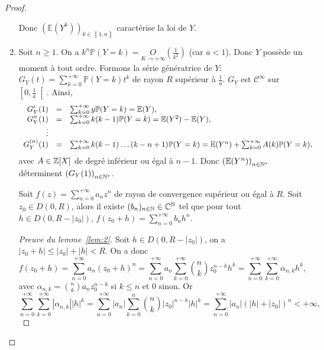 \documentclass[12pt]{article}
\begin{document}
\begin{proof}
\begin{enumerate}
        Donc $\left(\mathbb{E}(Y^{k})\right)_{k\in\left\llbracket1,n\right\rrbracket}$ caractérise la loi de $Y$.

        \item Soit $n\geqslant1$. On a $k^{n}\mathbb{P}(Y=k)=\underset{K\to+\infty}{O}\left(\frac{1}{k^{2}}\right)$ (car $a<1$). Donc $Y$ possède un moment à tout ordre. Formons la série génératrice de $Y$: $G_Y(t)=\sum_{k=0}^{+\infty}\mathbb{P}\left(Y=k\right)t^{k}$ de rayon $R$ supérieur à $\frac{1}{a}$. $G_Y$ est $\mathcal{C}^{\infty}$ sur $\left[0,\frac{1}{a}\right[$. Ainsi,
        \begin{equation}
            \begin{array}[]{rcl}
                G_Y'(1) &=&\sum_{k=0}^{+\infty}y\mathbb{P}(Y=k)=\mathbb{E}(Y),\\
                G_Y''(1) &=& \sum_{k=0}^{+\infty}k(k-1)\mathbb{P}(Y=k)=\mathbb{E}(Y^{2})-\mathbb{E}(Y),\\
                \vdots\\
                G_Y^{(n)}(1) &=& \sum_{k=0}^{+\infty}k(k-1)\dots(k-n+1)\mathbb{P}(Y=k)=\mathbb{E}(Y^{n})+\sum_{k=0}^{+\infty}A(k)\mathbb{P}(Y=k),
            \end{array}
        \end{equation}
        avec $A\in\mathbb{Z}[X]$ de degré inférieur ou égal à $n-1$. Donc $\left(\mathbb{E}(Y^{n})\right)_{n\in\mathbb{N}^{*}}$ déterminent $\left(G_Y(1)\right)_{n\in\mathbb{N}^{*}}$.

        \begin{lemma}
            \label{lem:2}
            Soit $f(z)=\sum_{n=0}^{+\infty}a_nz^{n}$ de rayon de convergence supérieur ou égal à $R$. Soit $z_0\in D(0,R)$, alors il existe $(b_n)_{n\in\mathbb{N}}\in\mathbb{C}^{\mathbb{N}}$ tel que pour tout $h\in D(0,R-\left\lvert z_0\right\rvert)$, $f(z_{0}+h)=\sum_{n=0}^{+\infty}b_n h^{n}$.
        \end{lemma}
        \begin{proof}[Preuve du lemme~\ref{lem:2}]
            Soit $h\in D(0,R-\left\lvert z_0\right\rvert)$, on a $\left\lvert z_{0}+h\right\rvert\leqslant\left\lvert z_0\right\rvert+\left\lvert h\right\rvert<R$. On a donc 
            \begin{equation}
                f(z_{0}+h)=\sum_{n=0}^{+\infty}a_n (z_{0}+h)^{n}=\sum_{n=0}^{+\infty}a_n\sum_{k=0}^{+\infty}\binom{n}{k}z_{0}^{n-k}h^{k}=\sum_{n=0}^{+\infty}\sum_{k=0}^{+\infty}\alpha_{n,k}h^{k},
            \end{equation}
            avec $\alpha_{n,k}=\binom{n}{k}a_nz_{0}^{n-k}$ si $k\leqslant n$ et 0 sinon. Or 
            \begin{equation}
                \sum_{n=0}^{+\infty}\sum_{k=0}^{+\infty}\left\lvert \alpha_{n,k}\right\rvert\left\lvert h\right\rvert^{k}=\sum_{n=0}^{+\infty}\left\lvert a_n\right\rvert\sum_{k=0}^{n}\binom{n}{k}\left\lvert z_{0}\right\rvert^{n-k}\left\lvert h\right\rvert^{k}=\sum_{n=0}^{+\infty}\left\lvert a_n\right\rvert\left(\left\lvert h\right\rvert+\left\lvert z_{0}\right\rvert\right)^{n}<+\infty,
            \end{equation}
            

\end{proof}
\end{enumerate}
\end{proof}
\end{document}
